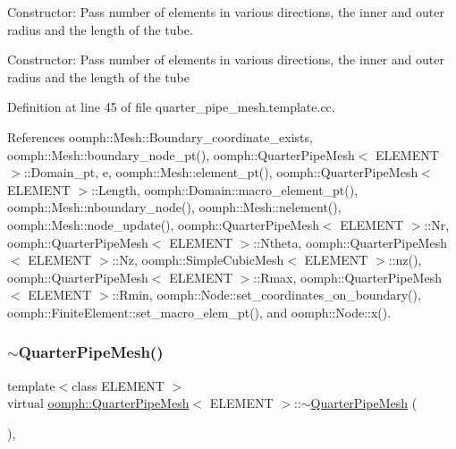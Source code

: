 Constructor\+: Pass number of elements in various directions, the inner and outer radius and the length of the tube. 

Constructor\+: Pass number of elements in various directions, the inner and outer radius and the length of the tube 

Definition at line 45 of file quarter\+\_\+pipe\+\_\+mesh.\+template.\+cc.



References oomph\+::\+Mesh\+::\+Boundary\+\_\+coordinate\+\_\+exists, oomph\+::\+Mesh\+::boundary\+\_\+node\+\_\+pt(), oomph\+::\+Quarter\+Pipe\+Mesh$<$ E\+L\+E\+M\+E\+N\+T $>$\+::\+Domain\+\_\+pt, e, oomph\+::\+Mesh\+::element\+\_\+pt(), oomph\+::\+Quarter\+Pipe\+Mesh$<$ E\+L\+E\+M\+E\+N\+T $>$\+::\+Length, oomph\+::\+Domain\+::macro\+\_\+element\+\_\+pt(), oomph\+::\+Mesh\+::nboundary\+\_\+node(), oomph\+::\+Mesh\+::nelement(), oomph\+::\+Mesh\+::node\+\_\+update(), oomph\+::\+Quarter\+Pipe\+Mesh$<$ E\+L\+E\+M\+E\+N\+T $>$\+::\+Nr, oomph\+::\+Quarter\+Pipe\+Mesh$<$ E\+L\+E\+M\+E\+N\+T $>$\+::\+Ntheta, oomph\+::\+Quarter\+Pipe\+Mesh$<$ E\+L\+E\+M\+E\+N\+T $>$\+::\+Nz, oomph\+::\+Simple\+Cubic\+Mesh$<$ E\+L\+E\+M\+E\+N\+T $>$\+::nz(), oomph\+::\+Quarter\+Pipe\+Mesh$<$ E\+L\+E\+M\+E\+N\+T $>$\+::\+Rmax, oomph\+::\+Quarter\+Pipe\+Mesh$<$ E\+L\+E\+M\+E\+N\+T $>$\+::\+Rmin, oomph\+::\+Node\+::set\+\_\+coordinates\+\_\+on\+\_\+boundary(), oomph\+::\+Finite\+Element\+::set\+\_\+macro\+\_\+elem\+\_\+pt(), and oomph\+::\+Node\+::x().

\mbox{\label{classoomph_1_1QuarterPipeMesh_a591e2d48bd5783bb390093a18c066ffc}} 
\subsubsection{\texorpdfstring{$\sim$\+Quarter\+Pipe\+Mesh()}{~QuarterPipeMesh()}}
{\footnotesize\ttfamily template$<$class E\+L\+E\+M\+E\+NT $>$ \\
virtual \hyperlink{classoomph_1_1QuarterPipeMesh}{oomph\+::\+Quarter\+Pipe\+Mesh}$<$ E\+L\+E\+M\+E\+NT $>$\+::$\sim$\hyperlink{classoomph_1_1QuarterPipeMesh}{Quarter\+Pipe\+Mesh} (\begin{DoxyParamCaption}{ }\end{DoxyParamCaption})\hspace{0.3cm}{\ttfamily [inline]}, {\ttfamily [virtual]}}



